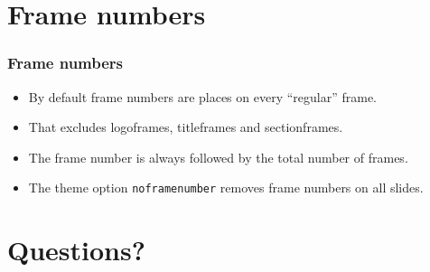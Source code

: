 \documentclass[aspectratio=169]{beamer}
\begin{document}
\section{Frame numbers}

\begin{frame}
    \frametitle{Frame numbers}
    \begin{itemize}
        \itemsep.25cm
        \item By default frame numbers are places on every ``regular'' frame.
        \item That excludes logoframes, titleframes and sectionframes.
        \item The frame number is always followed by the total number of frames.
        \item The theme option \texttt{noframenumber} removes frame numbers on all slides.
    \end{itemize}
\end{frame}

\section{Questions?}

\titleframe
\end{document}
